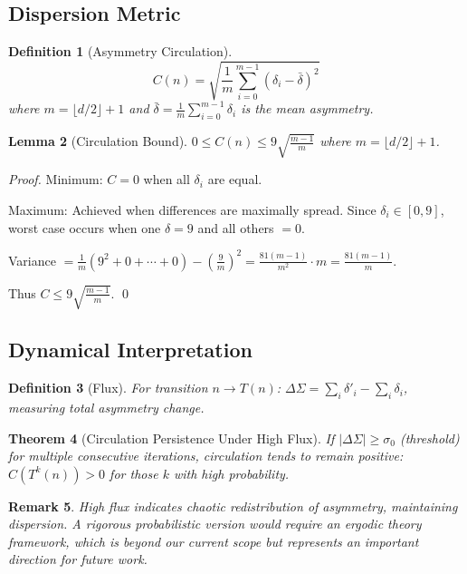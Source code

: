 \documentclass[12pt,a4paper]{article}
\newtheorem{theorem}{Theorem}[section]
\newtheorem{lemma}[theorem]{Lemma}
\newtheorem{definition}[theorem]{Definition}
\newtheorem{remark}[theorem]{Remark}
\begin{document}
\subsection{Dispersion Metric}

\begin{definition}[Asymmetry Circulation]
$$C(n) = \sqrt{\frac{1}{m}\sum_{i=0}^{m-1} (\delta_i - \bar{\delta})^2}$$
where $m = \lfloor d/2 \rfloor + 1$ and $\bar{\delta} = \frac{1}{m}\sum_{i=0}^{m-1} \delta_i$ is the mean asymmetry.
\end{definition}

\begin{lemma}[Circulation Bound]\label{lem:circ_bound}
$0 \leq C(n) \leq 9\sqrt{\frac{m-1}{m}}$ where $m = \lfloor d/2 \rfloor + 1$.
\end{lemma}

\begin{proof}
Minimum: $C = 0$ when all $\delta_i$ are equal.

Maximum: Achieved when differences are maximally spread. Since $\delta_i \in [0,9]$, worst case occurs when one $\delta = 9$ and all others $= 0$.

Variance $= \frac{1}{m}(9^2 + 0 + \cdots + 0) - \left(\frac{9}{m}\right)^2 = \frac{81(m-1)}{m^2} \cdot m = \frac{81(m-1)}{m}$.

Thus $C \leq 9\sqrt{\frac{m-1}{m}}$. \qed
\end{proof}

\subsection{Dynamical Interpretation}

\begin{definition}[Flux]
For transition $n \to T(n)$: $\Delta\Sigma = \sum_i \delta'_i - \sum_i \delta_i$, measuring total asymmetry change.
\end{definition}

\begin{theorem}[Circulation Persistence Under High Flux]\label{thm:circ_persist}
If $|\Delta\Sigma| \geq \sigma_0$ (threshold) for multiple consecutive iterations, circulation tends to remain positive: $C(T^k(n)) > 0$ for those $k$ with high probability.
\end{theorem}

\begin{remark}
High flux indicates chaotic redistribution of asymmetry, maintaining dispersion. A rigorous probabilistic version would require an ergodic theory framework, which is beyond our current scope but represents an important direction for future work.
\end{remark}
\end{document}
